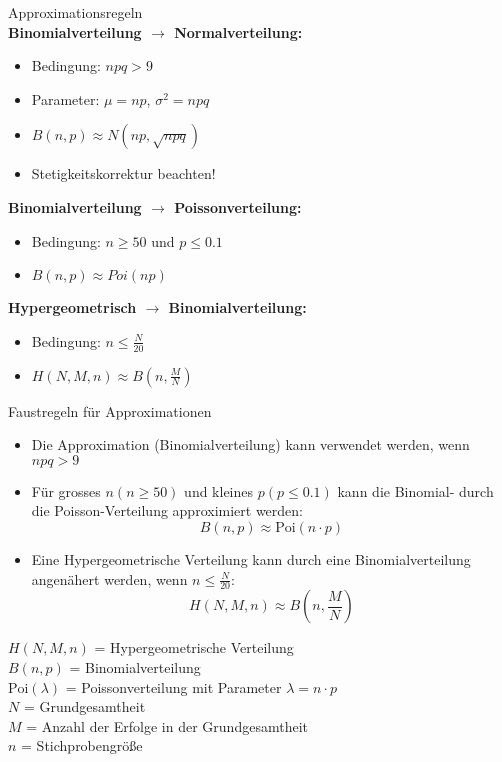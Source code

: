 \begin{theorem}{Approximationsregeln}\\
\textbf{Binomialverteilung $\rightarrow$ Normalverteilung:}
\begin{itemize}
    \item Bedingung: $npq > 9$
    \item Parameter: $\mu = np$, $\sigma^2 = npq$
    \item $B(n,p) \approx N(np, \sqrt{npq})$
    \item Stetigkeitskorrektur beachten!
\end{itemize}

\textbf{Binomialverteilung $\rightarrow$ Poissonverteilung:}
\begin{itemize}
    \item Bedingung: $n \geq 50$ und $p \leq 0.1$
    \item $B(n,p) \approx Poi(np)$
\end{itemize}

\textbf{Hypergeometrisch $\rightarrow$ Binomialverteilung:}
\begin{itemize}
    \item Bedingung: $n \leq \frac{N}{20}$
    \item $H(N,M,n) \approx B(n,\frac{M}{N})$
\end{itemize}
\end{theorem}

\begin{corollary}{Faustregeln für Approximationen}
\begin{itemize}
  \item Die Approximation (Binomialverteilung) kann verwendet werden, wenn $npq > 9$
  \item Für grosses $n(n \geq 50)$ und kleines $p(p \leq 0.1)$ kann die Binomial- durch die Poisson-Verteilung approximiert werden:
  $$
  B(n,p) \approx \text{Poi}(n \cdot p)
  $$
  
  \item Eine Hypergeometrische Verteilung kann durch eine Binomialverteilung angenähert werden, wenn $n \leq \frac{N}{20}$:
  $$
  H(N,M,n) \approx B(n,\frac{M}{N})
  $$
\end{itemize}
\end{corollary}

\begin{remark}
    $H(N,M,n)$ = Hypergeometrische Verteilung\\
    $B(n,p)$ = Binomialverteilung\\
    $\text{Poi}(\lambda)$ = Poissonverteilung mit Parameter $\lambda = n \cdot p$\\
    $N$ = Grundgesamtheit\\
    $M$ = Anzahl der Erfolge in der Grundgesamtheit\\
    $n$ = Stichprobengröße
\end{remark}

